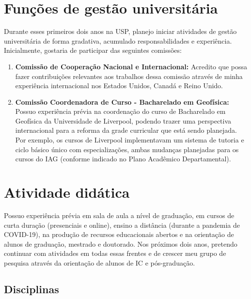 \documentclass[12pt,a4paper,oneside]{book}
\begin{document}
\chapter{Funções de gestão universitária}

Durante esses primeiros dois anos na USP, planejo iniciar atividades de gestão
universitária de forma gradativa, acumulado responsabilidades e experiência.
Inicialmente, gostaria de participar das seguintes comissões:

\begin{enumerate}
  \item \textbf{Comissão de Cooperação Nacional e Internacional:} Acredito que
    possa fazer contribuições relevantes aos trabalhos dessa comissão através
    de minha experiência internacional nos Estados Unidos, Canadá e Reino
    Unido.
  \item \textbf{Comissão Coordenadora de Curso - Bacharelado em Geofísica:}
    Possuo experiência prévia na coordenação do curso de Bacharelado em
    Geofísica da Universidade de Liverpool, podendo trazer uma perspectiva
    internacional para a reforma da grade curricular que está sendo planejada.
    Por exemplo, os cursos de Liverpool implementavam um sistema de tutoria e
    ciclo básico único com especializações, ambas mudanças planejadas para os
    cursos do IAG (conforme indicado no Plano Acadêmico Departamental).
\end{enumerate}



\chapter{Atividade didática}

Possuo experiência prévia em sala de aula a nível de graduação, em cursos de
curta duração (presenciais e online), ensino a distância (durante a pandemia de
COVID-19), na produção de recursos educacionais abertos e na orientação de
alunos de graduação, mestrado e doutorado.
Nos próximos dois anos, pretendo continuar com atividades em todas essas
frentes e de crescer meu grupo de pesquisa através da orientação de alunos de
IC e pós-graduação.

\section{Disciplinas}
\end{document}
